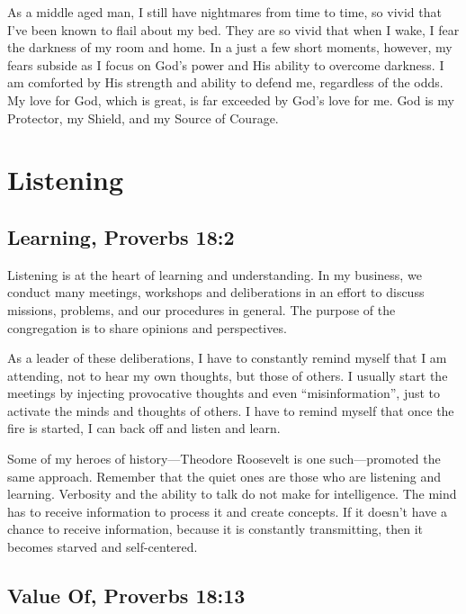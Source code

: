 \documentclass[12pt]{memoir}
\begin{document}
As a middle aged man, I still have nightmares from time to time, so
vivid that I've been known to flail about my bed. They are so vivid
that when I wake, I fear the darkness of my room and home. In a just
a few short moments, however, my fears subside as I focus on God's
power and His ability to overcome darkness. I am comforted by His
strength and ability to defend me, regardless of the odds. My love
for God, which is great, is far exceeded by God's love for me. God is my Protector, my Shield, and my Source of Courage. 

\section{Listening}

\subsection[Learning]{Learning, Proverbs 18:2}

Listening is at the heart of learning and understanding. In my business,
we conduct many meetings, workshops and deliberations in an effort
to discuss missions, problems, and our procedures in general. The purpose
of the congregation is to share opinions and perspectives.

As a leader of these deliberations, I have to constantly remind myself that I am attending, not to hear my own thoughts, but those of others. I usually start the meetings by injecting provocative thoughts and
even ``misinformation'', just to activate the minds and thoughts
of others. I have to remind myself that once the fire is started, I can back off and listen and learn. 

Some of my heroes of history---Theodore Roosevelt is one such---promoted
the same approach. Remember that the quiet ones are those who are listening
and learning. Verbosity and the ability to talk do not make for intelligence.
The mind has to receive information to process it and create concepts.
If it doesn't have a chance to receive information, because it is
constantly transmitting, then it becomes starved and self-centered. 

\subsection[Value Of]{Value Of, Proverbs 18:13}
\end{document}
